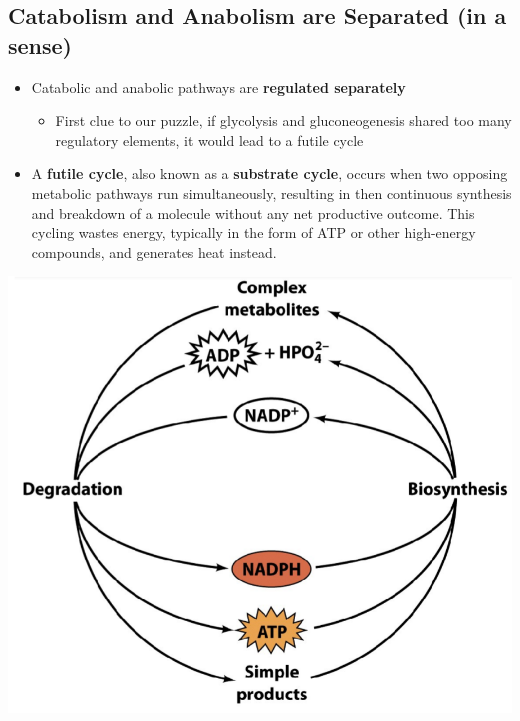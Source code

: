\documentclass[10pt]{article}
\begin{document}
\subsection*{Catabolism and Anabolism are Separated (in a sense)}
\begin{itemize}
	\item Catabolic and anabolic pathways are \textbf{regulated separately}
	\begin{itemize}
        \item First clue to our puzzle, if glycolysis and gluconeogenesis shared too many regulatory elements, it would lead to a futile cycle
    \end{itemize}
    \item A \textbf{futile cycle}, also known as a \textbf{substrate cycle}, occurs when two opposing metabolic pathways run simultaneously, resulting in then continuous synthesis and breakdown of a molecule without any net productive outcome.  This cycling wastes energy, typically in the form of ATP or other high-energy compounds, and generates heat instead.
\end{itemize}
\begin{center} 
	\includegraphics*[scale=0.4]{L2_19.png}
\end{center}
\end{document}
